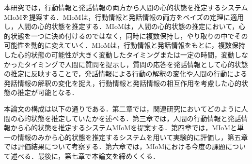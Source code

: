 \par
本研究では，行動情報と発話情報の両方から人間の心的状態を推定するシステムMIoMを提案する．MIoMは，行動情報と発話情報の両方をベイズの定理に適用し，人間の心的状態を推定する．MIoMは，人間の心的状態の推定において，心的状態を一つに決め付けるのではなく，同時に複数保持し，やり取りの中でその可能性を動的に変えていく．MIoMは，行動情報と発話情報をもとに，複数保持した心的状態の可能性が大きく変動したタイミングまたは一定の時間，変動しなかったタイミングで人間に質問を提示し，質問の応答を発話情報として心的状態の推定に反映することで，発話情報による行動の解釈の変化や人間の行動による発話情報の解釈の変化を捉え，行動情報と発話情報の相互作用を考慮した心的状態の推定が可能となる．

\par
本論文の構成は以下の通りである．第二章では，関連研究においてどのように人間の心的状態を推定していたかを述べる．第三章では，人間の行動情報と発話情報から心的状態を推定するシステムMIoMを提案する．第四章では，MIoMと単一の情報のみから心的状態を推定するシステムを用いて実験的に評価し，第五章では評価結果について考察する．第六章では，MIoMにおける今度の課題について述べる．最後に，第七章で本論文を締めくくる．
